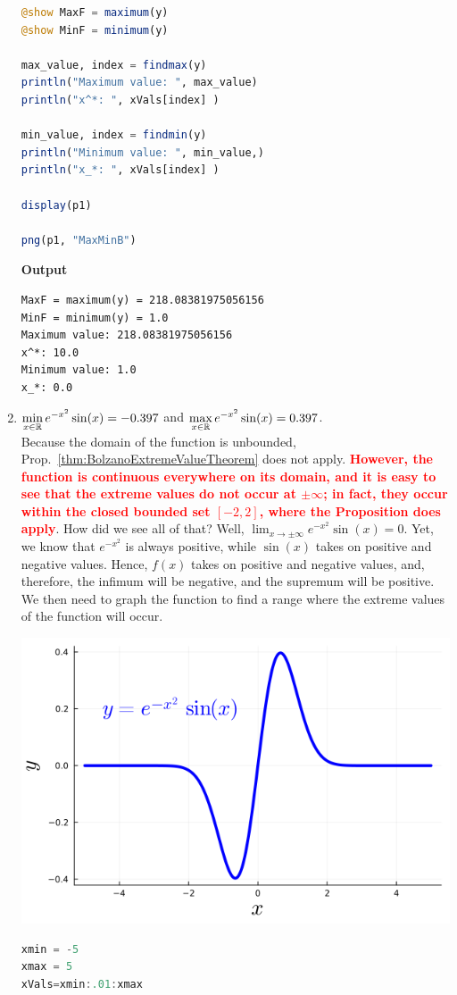 \begin{enumerate}
\begin{lstlisting}[language=Julia,style=mystyle]
@show MaxF = maximum(y)
@show MinF = minimum(y)

max_value, index = findmax(y)
println("Maximum value: ", max_value)
println("x^*: ", xVals[index] )

min_value, index = findmin(y)
println("Minimum value: ", min_value,)
println("x_*: ", xVals[index] )

display(p1)

png(p1, "MaxMinB")
\end{lstlisting}
\textbf{Output} 
\begin{verbatim}
MaxF = maximum(y) = 218.08381975056156
MinF = minimum(y) = 1.0
Maximum value: 218.08381975056156
x^*: 10.0
Minimum value: 1.0
x_*: 0.0
\end{verbatim}

 
\item   \Ans   $\displaystyle \min_{x \in \mathbb R} e^{-x^2} \sin(x) = -0.397$ and  $\displaystyle \max_{x \in \mathbb R}  e^{-x^2} \sin(x) = 0.397$.\\  
    
    Because the domain of the function is unbounded, Prop.~\ref{thm:BolzanoExtremeValueTheorem} does not apply. \textcolor{red}{\bf However, the function is continuous everywhere on its domain, and it is easy to see that the extreme values do not occur at $\pm \infty$; in fact, they occur within the closed bounded set $[-2, 2]$, where the Proposition does apply}. How did we see all of that? Well, $\displaystyle \lim_{x \to \pm \infty} e^{-x^2} \sin(x) =0$. Yet, we know that $e^{-x^2}$ is always positive, while $\sin(x)$ takes on positive and negative values. Hence, $f(x)$ takes on positive and negative values, and, therefore, the infimum will be negative, and the supremum will be positive. We then need to graph the function to find a range where the extreme values of the function will occur. 

         \begin{center}
    \includegraphics[width=0.45\columnwidth]{graphics/Chap04/MaxMinC.png}
    \end{center}

\begin{lstlisting}[language=Julia,style=mystyle]
xmin = -5
xmax = 5
xVals=xmin:.01:xmax


\end{lstlisting}
\end{enumerate}
